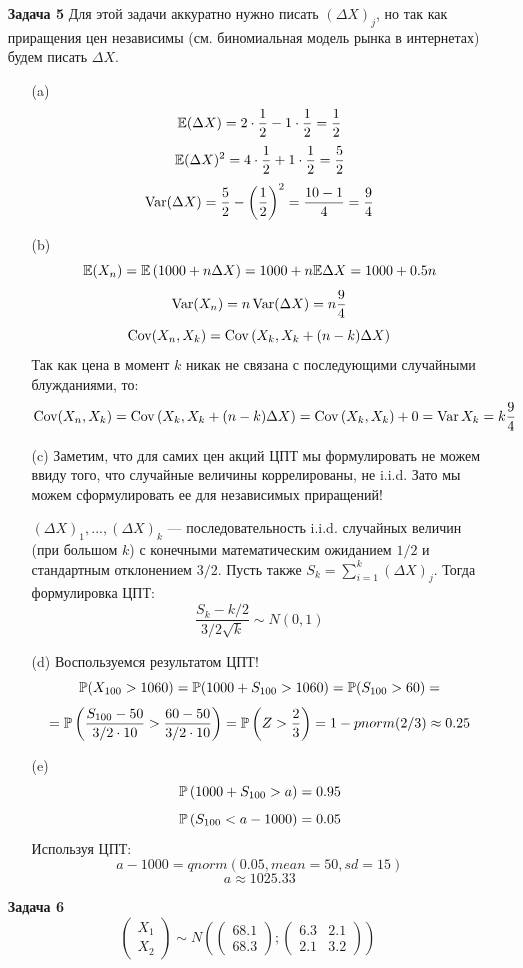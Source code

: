 \documentclass[12pt, a4paper]{article}\usepackage[]{graphicx}\usepackage[]{color}
\begin{document}
\begin{enumerate}
					\item[\textbf{Задача 5}]
					Для этой задачи аккуратно нужно писать \( \left(\Delta X \right)_j \), но так как приращения цен независимы (см. биномиальная модель рынка в интернетах) будем писать \( \Delta X \).
					\begin{itemize}
						\item[(a)] \[\E (\Delta X) = 2 \cdot \dfrac{1}{2} - 1 \cdot \dfrac{1}{2} = \dfrac{1}{2} \]
						\[\E (\Delta X)^2 = 4 \cdot \dfrac{1}{2} + 1 \cdot \dfrac{1}{2} = \dfrac{5}{2} \]
						\[\Var (\Delta X) = \dfrac{5}{2} - \left(\dfrac{1}{2}\right)^2 = \dfrac{10-1}{4}=\dfrac{9}{4} \]
						\item[(b)] \[\E (X_n) = \E \left(1000 + n\Delta X \right)  = 1000 + n \E \Delta X = 1000 + 0.5 n     \]
						\[ \Var (X_n) = n \Var (\Delta X) = n \dfrac{9}{4}  \]
						\[ \Cov (X_n, X_k) = \Cov \left(X_k, X_k + (n-k) \Delta X \right)     \]
						Так как цена в момент $k$ никак не связана с последующими случайными блужданиями, то:
						\[ \Cov (X_n, X_k) = \Cov \left(X_k, X_k + (n-k) \Delta X \right) =  \Cov \left(X_k, X_k \right) + 0 = \Var X_k = k \dfrac{9}{4}    \]
						\item[(c)] Заметим, что для самих цен акций ЦПТ мы формулировать не можем ввиду того, что случайные величины коррелированы, не i.i.d. Зато мы можем сформулировать ее для независимых приращений!

						\( \left(\Delta X \right)_1, ..., \left(\Delta X \right)_{k} \) — последовательность i.i.d. случайных величин (при большом $k$) с конечными математическим ожиданием \(1/2 \) и стандартным отклонением \(3/2 \). Пусть также \( S_k = \sum_{i=1}^k \left(\Delta X \right)_j \). Тогда формулировка ЦПТ:
						\[ \dfrac{S_k - k/2}{3/2 \sqrt{k}} \sim N(0,1)    \]
						\item[(d)] Воспользуемся результатом ЦПТ!
						\[\P(X_{100} > 1060) = \P (1000 + S_{100} > 1060) = \P(S_{100} >60) = \]
						\[ = \P \left(\dfrac{S_{100} -50 }{3/2\cdot 10} > \dfrac{60-50}{3/2 \cdot 10}\right) = \P \left(Z > \dfrac{2}{3}\right) = 1-pnorm(2/3) \approx 0.25   \]

						\item[(e)] \[ \P \left(1000 + S_{100} > a \right) = 0.95              \]
						\[ \P \left( S_{100} < a-1000 \right) = 0.05              \]
						Используя ЦПТ:
						\[ a-1000 = qnorm(0.05, mean = 50, sd = 15 )            \]
						\[ a \approx 1025.33   \]
					\end{itemize}

					\item[\textbf{Задача 6}]
					$$\begin{pmatrix}
					X_1 \\
					X_2
					\end{pmatrix} \sim N \left( \begin{pmatrix}
					68.1 \\
					68.3
					\end{pmatrix} ; \begin{pmatrix}
					6.3 & 2.1 \\
					2.1 & 3.2
					\end{pmatrix}                   \right)$$


\end{enumerate}
\end{document}
